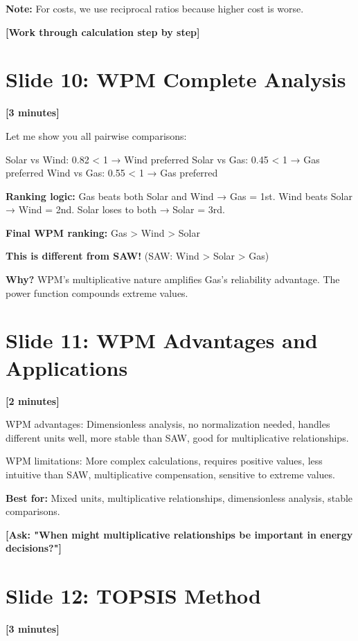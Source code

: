 \documentclass[12pt]{article}
\begin{document}
\textcolor{emphasis}{\textbf{Note:}} For costs, we use reciprocal ratios because higher cost is worse.

\textcolor{speakernote}{\textbf{[Work through calculation step by step]}}

\section*{Slide 10: WPM Complete Analysis}
\textcolor{timing}{\textbf{[3 minutes]}}

Let me show you all pairwise comparisons:

Solar vs Wind: 0.82 < 1 → Wind preferred
Solar vs Gas: 0.45 < 1 → Gas preferred  
Wind vs Gas: 0.55 < 1 → Gas preferred

\textcolor{emphasis}{\textbf{Ranking logic:}} Gas beats both Solar and Wind → Gas = 1st. Wind beats Solar → Wind = 2nd. Solar loses to both → Solar = 3rd.

\textcolor{emphasis}{\textbf{Final WPM ranking:}} Gas > Wind > Solar

\textcolor{emphasis}{\textbf{This is different from SAW!}} (SAW: Wind > Solar > Gas)

\textcolor{emphasis}{\textbf{Why?}} WPM's multiplicative nature amplifies Gas's reliability advantage. The power function compounds extreme values.

\section*{Slide 11: WPM Advantages and Applications}
\textcolor{timing}{\textbf{[2 minutes]}}

WPM advantages: Dimensionless analysis, no normalization needed, handles different units well, more stable than SAW, good for multiplicative relationships.

WPM limitations: More complex calculations, requires positive values, less intuitive than SAW, multiplicative compensation, sensitive to extreme values.

\textcolor{emphasis}{\textbf{Best for:}} Mixed units, multiplicative relationships, dimensionless analysis, stable comparisons.

\textcolor{speakernote}{\textbf{[Ask: "When might multiplicative relationships be important in energy decisions?"]}}

\section*{Slide 12: TOPSIS Method}
\textcolor{timing}{\textbf{[3 minutes]}}
\end{document}
